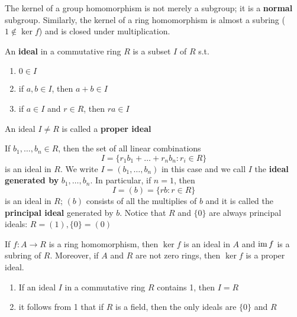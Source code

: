 \documentclass[11pt]{article}
\begin{document}
The kernel of a group homomorphism is not merely a subgroup; it is a \textbf{normal}
subgroup. Similarly, the kernel of a ring homomorphism is almost a subring
(\(1\not\in\ker f\))
and is closed under multiplication.

\begin{definition}[]
An \textbf{ideal} in a commutative ring \(R\) is a subset \(I\) of \(R\) s.t. 
\begin{enumerate}
\item \(0\in I\)
\item if \(a,b\in I\), then \(a+b\in I\)
\item if \(a\in I\) and \(r\in R\), then \(ra\in I\)
\end{enumerate}
\end{definition}

An ideal \(I\neq R\) is called a \textbf{proper ideal}

\begin{examplle}[]
If \(b_1,\dots,b_n\in R\), then the set of all linear combinations
\begin{equation*}
I=\{r_1b_1+\dots+r_nb_n:r_i\in R\}
\end{equation*}
is an ideal in \(R\). We write \(I=(b_1,\dots,b_n)\) in this case and we call
\(I\) the \textbf{ideal generated by} \(b_1,\dots,b_n\). In particular, if \(n=1\), then
\begin{equation*}
I=(b)=\{rb:r\in R\}
\end{equation*}
is an ideal in \(R\); \((b)\) consists of all the multiplies of \(b\) and it is
called the \textbf{principal ideal} generated by \(b\). Notice that \(R\) and \(\{0\}\) are
always principal ideals: \(R=(1),\{0\}=(0)\)
\end{examplle}


\begin{proposition}[]
If \(f:A\to R\) is a ring homomorphism, then \(\ker f\) is an ideal in \(A\)
and \(\operatorname{im} f\) is a subring of \(R\). Moreover, if \(A\) and \(R\) are not zero rings,
then \(\ker f\) is a proper ideal.
\end{proposition}

\begin{examplle}[]
\begin{enumerate}
\item If an ideal \(I\) in a commutative ring \(R\) contains 1, then \(I=R\)
\item it follows from 1 that if \(R\) is a field, then the only ideals are \(\{0\}\)
and \(R\)
\end{enumerate}
\end{examplle}
\end{document}
